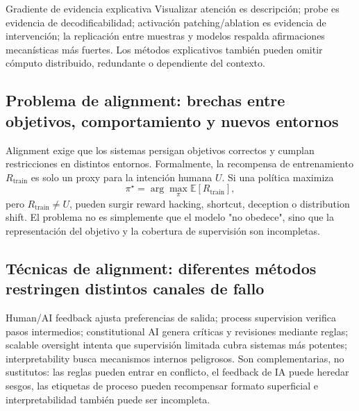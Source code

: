 \begin{importantbox}{Gradiente de evidencia explicativa}
Visualizar atención es descripción; probe es evidencia de decodificabilidad; activación patching/ablation es evidencia de intervención; la replicación entre muestras y modelos respalda afirmaciones mecanísticas más fuertes. Los métodos explicativos también pueden omitir cómputo distribuido, redundante o dependiente del contexto.
\end{importantbox}

\subsection{Problema de alignment: brechas entre objetivos, comportamiento y nuevos entornos}

Alignment exige que los sistemas persigan objetivos correctos y cumplan restricciones en distintos entornos. Formalmente, la recompensa de entrenamiento $R_{\mathrm{train}}$ es solo un proxy para la intención humana $U$. Si una política maximiza
\[
\pi^{\star}=\arg\max_{\pi}\mathbb{E}[R_{\mathrm{train}}],
\]
pero $R_{\mathrm{train}}\neq U$, pueden surgir reward hacking, shortcut, deception o distribution shift. El problema no es simplemente que el modelo "no obedece", sino que la representación del objetivo y la cobertura de supervisión son incompletas.




\subsection{Técnicas de alignment: diferentes métodos restringen distintos canales de fallo}

Human/AI feedback ajusta preferencias de salida; process supervision verifica pasos intermedios; constitutional AI genera críticas y revisiones mediante reglas; scalable oversight intenta que supervisión limitada cubra sistemas más potentes; interpretability busca mecanismos internos peligrosos. Son complementarias, no sustitutos: las reglas pueden entrar en conflicto, el feedback de IA puede heredar sesgos, las etiquetas de proceso pueden recompensar formato superficial e interpretabilidad también puede ser incompleta.

